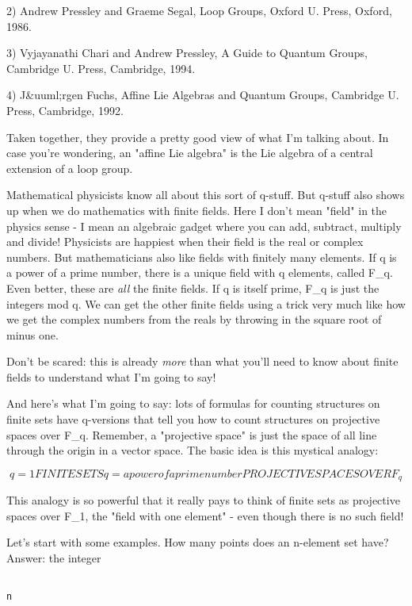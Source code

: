 2) Andrew Pressley and Graeme Segal, Loop Groups, Oxford U. Press,
Oxford, 1986.

3) Vyjayanathi Chari and Andrew Pressley, A Guide to Quantum Groups, 
Cambridge U. Press, Cambridge, 1994.

4) J&uuml;rgen Fuchs, Affine Lie Algebras and Quantum Groups, Cambridge
U. Press, Cambridge, 1992.  


Taken together, they provide a pretty good view of what I'm talking
about.  In case you're wondering, an "affine Lie algebra" is
the Lie algebra of a central extension of a loop group.


Mathematical physicists know all about this sort of q-stuff.  But
q-stuff also shows up when we do mathematics with finite fields.  Here I
don't mean "field" in the physics sense - I mean an algebraic
gadget where you can add, subtract, multiply and divide!  Physicists are
happiest when their field is the real or complex numbers.  But
mathematicians also like fields with finitely many elements.  If q is a
power of a prime number, there is a unique field with q elements, called
F_{q}.  Even better, these are \emph{all} the finite fields.
If q is itself prime, F_{q} is just the integers mod q.  We can
get the other finite fields using a trick very much like how we get the
complex numbers from the reals by throwing in the square root of minus
one.

Don't be scared: this is already \emph{more} than what you'll need to know
about finite fields to understand what I'm going to say!

And here's what I'm going to say: lots of formulas for counting
structures on finite sets have q-versions that tell you how to count
structures on projective spaces over F_{q}.  Remember, a "projective
space" is just the space of all line through the origin in a vector
space.  The basic idea is this mystical analogy:


$$

q = 1                            FINITE SETS 
q = a power of a prime number    PROJECTIVE SPACES OVER F_{q}
$$
    
This analogy is so powerful that it really pays to think of finite
sets as projective spaces over F_{1}, 
the "field with one element" - 
even though there is no such field!

Let's start with some examples.  How many points does an n-element set
have?  Answer: the integer


\begin{verbatim}

n
\end{verbatim}
    
